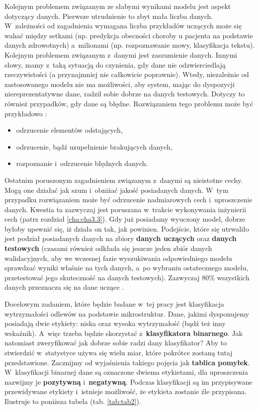 Kolejnym problemem związanym ze słabymi wynikami modelu jest aspekt dotyczący danych. Pierwsze utrudnienie to zbyt mała liczba danych. W~zależności od zagadnienia wymagana liczba przykładów uczących może się wahać między setkami (np. predykcja obecności choroby u pacjenta na podstawie danych zdrowotnych) a~milionami (np. rozpoznawanie mowy, klasyfikacja tekstu). Kolejnym problemem związanym z~danymi jest zaszumienie danych. Innymi słowy, mamy z~taką sytuacją do czynienia, gdy dane nie odzwierciedlają rzeczywistości (a przynajmniej nie całkowicie poprawnie). Wtedy, niezależnie od zastosowanego modelu nie ma możliwości, aby system, mając do dyspozycji niereprezentatywne dane, radził sobie dobrze na danych testowych. Dotyczy to również przypadków, gdy dane są błędne. Rozwiązaniem tego problemu może być przykładowo \cite{Sawka18}:
\begin{itemize}
\item
odrzucenie elementów odstających,
\item
odrzucenie, bądź uzupełnienie brakujących danych,
\item
rozpoznanie i~odrzucenie błędnych danych.
\end{itemize}

Ostatnim poruszonym zagadnieniem  związanym z~danymi są nieistotne cechy. Mogą one działać jak szum i~obniżać jakość posiadanych danych. W~tym przypadku rozwiązaniem może być odrzucenie nadmiarowych cech i~uproszczenie danych. Kwestia ta zazwyczaj jest poruszana w~trakcie wykonywania inżynierii cech (patrz rozdział \ref{cha:cha3.3}).
Gdy już posiadamy wyuczony model, dobrze byłoby upewnić się, iż działa on tak, jak powinien. Podejście, które się utrwaliło jest podział posiadanych danych na zbiory \textbf{danych uczących} oraz \textbf{danych testowych} (czasami również odkłada się jeszcze jeden zbiór danych walidacyjnych, aby we wczesnej fazie wyszukiwania odpowiedniego modelu sprawdzać wyniki właśnie na tych danych, a~po wybraniu ostatecznego modelu, przetestować jego skuteczność na danych testowych). Zazwyczaj 80\% wszystkich danych przeznacza się na dane uczące \cite{Sawka18}.

Docelowym zadaniem, które będzie badane w~tej pracy jest klasyfikacja wytrzymałości odlewów na podstawie mikrostruktur. Dane, jakimi dysponujemy posiadają dwie etykiety: niska oraz wysoka wytrzymałość (bądź też inny wskaźnik). A~więc trzeba będzie skorzystać z~\textbf{klasyfikatora binarnego}. Jak natomiast zweryfikować jak dobrze sobie radzi dany klasyfikator? Aby to stwierdzić w~statystyce używa się wielu miar, które pokrótce zostaną tutaj przedstawione. Zacznijmy od wyjaśnienia takiego pojęcia jak \textbf{tablica pomyłek}. W~klasyfikacji binarnej dane są oznaczone dwiema etykietami, dla uproszczenia nazwijmy je \textbf{pozytywną} i~\textbf{negatywną}. Podczas klasyfikacji są im przypisywane przewidywane etykiety i~istnieje możliwość, że etykieta zostanie źle przypisana. Ilustruje to poniższa tabela (tab. \ref{tab:tab2}).

